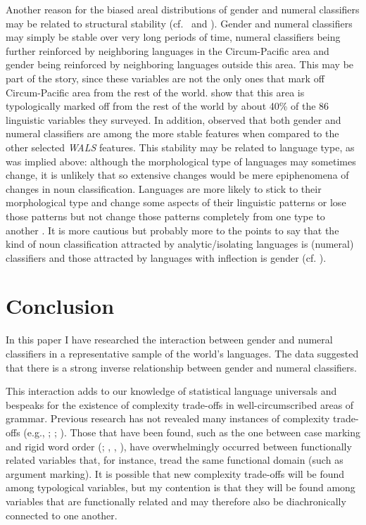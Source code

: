 \documentclass[output=collectionpaper]{langsci/langscibook}
\begin{document}
Another reason for the biased areal distributions of gender and numeral classifiers may be related to structural stability (cf.\  and \citealt[196--202]{Dahl2004}). Gender and numeral classifiers may simply be stable over very long periods of time, numeral classifiers being further reinforced by neighboring languages in the Circum-Pacific area and gender being reinforced by neighboring languages outside this area. This may be part of the story, since these variables are not the only ones that mark off Circum-Pacific area from the rest of the world. \citet{Bickel2006} show that this area is typologically marked off from the rest of the world by about 40\% of the 86 linguistic variables they surveyed. In addition, \citet[13]{Dediu2013} observed that both gender and numeral classifiers are among the more stable features when compared to the other selected \textit{WALS} features. This stability may be related to language type, as was implied above: although the morphological type of languages may sometimes change, it is unlikely that so extensive changes would be mere epiphenomena of changes in noun classification. Languages are more likely to stick to their morphological type and change some aspects of their linguistic patterns or lose those patterns but not change those patterns completely from one type to another \citep[346]{Passer2016b}. It is more cautious but probably more to the points to say that the kind of noun classification attracted by analytic/isolating languages is (numeral) classifiers and those attracted by languages with inflection is gender (cf. \citealt[137]{Corbett1991}).


\section{Conclusion}
\label{sec:Sinne:6}

In this paper I have researched the interaction between gender and numeral classifiers in a representative sample of the world's languages. The data suggested that there is a strong inverse relationship between gender and numeral classifiers.

This interaction adds to our knowledge of statistical language universals and bespeaks for the existence of complexity trade-offs in well-circumscribed areas of grammar. Previous research has not revealed many instances of complexity trade-offs (e.g., \citealt{Shosted2006}; \citealt{Maddieson2006}; \citealt{Miestamo2009}). Those that have been found, such as the one between case marking and rigid word order (\citealt{Siewierska1998}; \citealt{Sinnemaeki2008}, \citealt{Sinnemaeki2011}, \citealt{Sinnemaeki2014}), have overwhelmingly occurred between functionally related variables that, for instance, tread the same functional domain (such as argument marking). It is possible that new complexity trade-offs will be found among typological variables, but my contention is that they will be found among variables that are functionally related and may therefore also be diachronically connected to one another.
\end{document}
